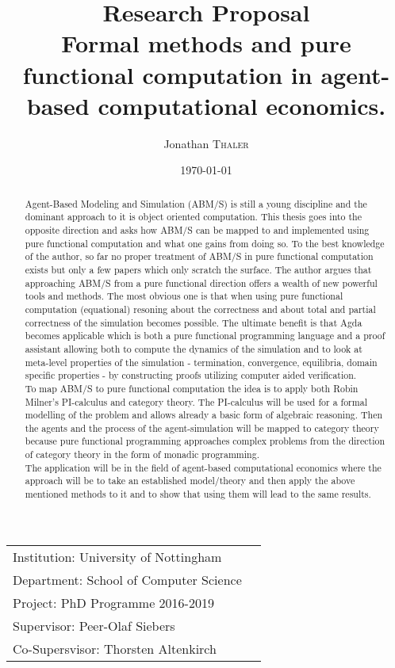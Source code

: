 \documentclass{article}
\title{Research Proposal \\ Formal methods and pure functional computation in agent-based computational economics.} %
\author{Jonathan \textsc{Thaler}} %
\date{\today} %
\begin{document}
\maketitle %

\begin{center}
\begin{tabular}{l r}
Institution: University of Nottingham \\
Department: School of Computer Science \\
Project: PhD Programme 2016-2019 \\
Supervisor: Peer-Olaf Siebers \\
Co-Supersvisor: Thorsten Altenkirch 
\end{tabular}
\end{center}

\begin{abstract}
Agent-Based Modeling and Simulation (ABM/S) is still a young discipline and the dominant approach to it is object oriented computation. This thesis goes into the opposite direction and asks how ABM/S can be mapped to and implemented using pure functional computation and what one gains from doing so. To the best knowledge of the author, so far no proper treatment of ABM/S in pure functional computation exists but only a few papers which only scratch the surface. The author argues that approaching ABM/S from a pure functional direction  offers a wealth of new powerful tools and methods. The most obvious one is that when using pure functional computation (equational) resoning about the correctness and about total and partial correctness of the simulation becomes possible. The ultimate benefit is that Agda becomes applicable which is both a pure functional programming language and a proof assistant allowing both to compute the dynamics of the simulation and to look at meta-level properties of the simulation - termination, convergence, equilibria, domain specific properties - by constructing proofs utilizing computer aided verification. \\
To map ABM/S to pure functional computation the idea is to apply both Robin Milner's PI-calculus and category theory. The PI-calculus will be used for a formal modelling of the problem and allows already a basic form of algebraic reasoning. Then the agents and the process of the agent-simulation will be mapped to category theory because pure functional programming approaches complex problems from the direction of category theory in the form of monadic programming. \\
The application will be in the field of agent-based computational economics where the approach will be to take an established model/theory and then apply the above mentioned methods to it and to show that using them will lead to the same results. 
\end{abstract}
\end{document}
